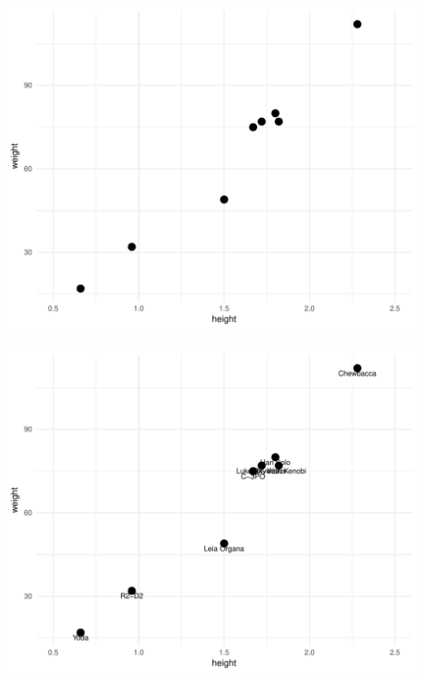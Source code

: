 \documentclass[12pt]{beamer}\usepackage[]{graphicx}\usepackage[]{color}
\makeatletter
\def\maxwidth{ %
  \ifdim\Gin@nat@width>\linewidth
    \linewidth
  \else
    \Gin@nat@width
  \fi
}
\newenvironment{knitrout}{}{} %
\makeatother
\begin{document}
\begin{frame}[fragile]
\frametitle{}

\begin{knitrout}\footnotesize
{}\color{fgcolor}

{\centering \includegraphics[width=\maxwidth]{figure/scatterplot1-1} 

}



\end{knitrout}

\end{frame}


\begin{frame}[fragile]
\frametitle{}

\begin{knitrout}\footnotesize
{}\color{fgcolor}

{\centering \includegraphics[width=\maxwidth]{figure/scatterplot2-1} 

}



\end{knitrout}

\end{frame}
\end{document}
